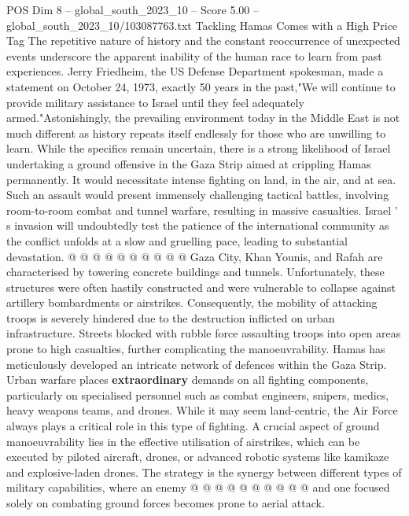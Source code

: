 \begin{textsample}{POS Dim 8 – global\_south\_2023\_10 – Score 5.00 – global\_south\_2023\_10/103087763.txt}  \label{ex:f8_pos_351}
Tackling Hamas Comes with a High Price Tag The repetitive nature of history and the constant reoccurrence of unexpected events underscore the apparent inability of the human race to learn from past experiences.
Jerry Friedheim, the US Defense Department spokesman, made a statement on October 24, 1973, exactly 50 years in the past,"We will continue to provide military assistance to Israel until they feel adequately armed."Astonishingly, the prevailing environment today in the Middle East is not much different as history repeats itself endlessly for those who are unwilling to learn.
While the specifics remain uncertain, there is a strong likelihood of Israel undertaking a ground offensive in the Gaza Strip aimed at crippling Hamas permanently.
It would necessitate intense fighting on land, in the air, and at sea.
Such an assault would present immensely challenging tactical battles, involving room-to-room combat and tunnel warfare, resulting in massive casualties.
Israel ' s invasion will undoubtedly test the patience of the international community as the conflict unfolds at a slow and gruelling pace, leading to substantial devastation. @ @ @ @ @ @ @ @ @ @ Gaza City, Khan Younis, and Rafah are characterised by towering concrete buildings and tunnels.
Unfortunately, these structures were often hastily constructed and were vulnerable to collapse against artillery bombardments or airstrikes.
Consequently, the mobility of attacking troops is severely hindered due to the destruction inflicted on urban infrastructure.
Streets blocked with rubble force assaulting troops into open areas prone to high casualties, further complicating the manoeuvrability.
Hamas has meticulously developed an intricate network of defences within the Gaza Strip.
Urban warfare places \textbf{extraordinary} demands on all fighting components, particularly on specialised personnel such as combat engineers, snipers, medics, heavy weapons teams, and drones.
While it may seem land-centric, the Air Force always plays a critical role in this type of fighting.
A crucial aspect of ground manoeuvrability lies in the effective utilisation of airstrikes, which can be executed by piloted aircraft, drones, or advanced robotic systems like kamikaze and explosive-laden drones.
The strategy is the synergy between different types of military capabilities, where an enemy @ @ @ @ @ @ @ @ @ @ and one focused solely on combating ground forces becomes prone to aerial attack.

\end{textsample}
